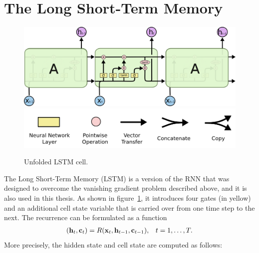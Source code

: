 	\section{The Long Short-Term Memory}
		\begin{figure}[tb]
			\centering
			\includegraphics[width=0.9\linewidth]{Images/LSTM/LSTM3-chain}\\
			\vspace{5mm}
			\includegraphics[width=0.5\linewidth]{Images/LSTM/LSTM2-notation}
			\caption[Unfolded LSTM cell]
					{Unfolded LSTM cell. 
					\imagecourtesycolah}
			\label{fig:LSTM3-chain}
		\end{figure}
		The Long Short-Term Memory (LSTM) is a version of the RNN that was designed to overcome the vanishing gradient problem described above, and it is also used in this thesis.
		As shown in figure~\ref{fig:LSTM3-chain}, it introduces four gates (in yellow) and an additional cell state variable that is carried over from one time step to the next.
		The recurrence can be formulated as a function 
		\begin{align}\label{eq:LSTM_recurrence}
			(\mathbf{h}_t, \mathbf{c}_t) = R(\mathbf{x}_t, \mathbf{h}_{t-1}, \mathbf{c}_{t-1}), & & t = 1, \dots, T.
		\end{align}
		More precisely, the hidden state and cell state are computed as follows:
